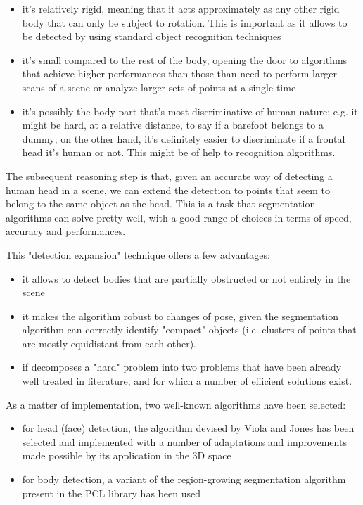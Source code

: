\documentclass[a4paper,11pt,titlepage]{article}
\begin{document}
\begin{itemize}
  \item it's relatively rigid, meaning that it acts approximately as any other rigid
    body that can only be subject to rotation. This is important as it allows to
    be detected by using standard object recognition techniques
  \item it's small compared to the rest of the body, opening the door to algorithms
    that achieve higher performances than those than need to perform larger scans
    of a scene or analyze larger sets of points at a single time
  \item it's possibly the body part that's most discriminative of human nature: e.g.
    it might be hard, at a relative distance, to say if a barefoot belongs to a
    dummy; on the other hand, it's definitely easier to discriminate if a frontal
    head it's human or not. This might be of help to recognition algorithms.
\end{itemize}

The subsequent reasoning step is that, given an accurate way of detecting a
human head in a scene, we can extend the detection to points that seem to
belong to the same object as the head. This is a task that segmentation
algorithms can solve pretty well, with a good range of choices in terms of
speed, accuracy and performances.

This "detection expansion" technique offers a few advantages:

\begin{itemize}
  \item it allows to detect bodies that are partially obstructed or not entirely in
    the scene
  \item it makes the algorithm robust to changes of pose, given the segmentation
    algorithm can correctly identify "compact" objects (i.e. clusters of points
    that are mostly equidistant from each other).
  \item if decomposes a "hard" problem into two problems that have been already well
    treated in literature, and for which a number of efficient solutions exist.
\end{itemize}

As a matter of implementation, two well-known algorithms have been selected:

\begin{itemize}
  \item for head (face) detection, the algorithm devised by Viola and Jones
    \cite{violajones} has been selected and implemented with a number of
    adaptations and improvements made possible by its application in the 3D space
  \item for body detection, a variant of the region-growing segmentation algorithm
    present in the PCL library has been used
\end{itemize}
\end{document}
